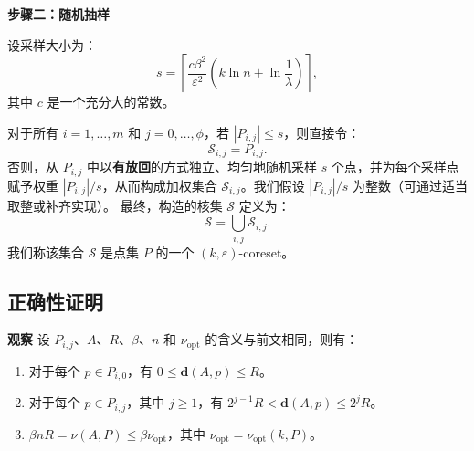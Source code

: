 \documentclass[lang=cn,newtx,10pt,scheme=chinese,chinesefont=nofont,citestyle=gb7714-2015, bibstyle=gb7714-2015]{elegantbook}
\begin{document}
\begin{refsection}




\noindent \textbf{步骤二：随机抽样}

设采样大小为：
\begin{equation}
s = \left\lceil \frac{c \beta^2}{\varepsilon^2} \left( k \ln n + \ln \frac{1}{\lambda} \right) \right\rceil,
\end{equation}
其中 $c$ 是一个充分大的常数。

对于所有 $i = 1, \dots, m$ 和 $j = 0, \dots, \phi$，若 $|P_{i,j}| \leq s$，则直接令：
\[
\mathcal{S}_{i,j} = P_{i,j}.
\]
否则，从 $P_{i,j}$ 中以\textbf{有放回}的方式独立、均匀地随机采样 $s$ 个点，并为每个采样点赋予权重 $|P_{i,j}| / s$，从而构成加权集合 $\mathcal{S}_{i,j}$。我们假设 $|P_{i,j}| / s$ 为整数（可通过适当取整或补齐实现）。
最终，构造的核集 $\mathcal{S}$ 定义为：
\[
\mathcal{S} = \bigcup_{i,j} \mathcal{S}_{i,j}.
\]
我们称该集合 $\mathcal{S}$ 是点集 $P$ 的一个 $(k, \varepsilon)$-coreset。

\subsection{正确性证明}
\noindent \textbf{观察}  \quad 设 $P_{i,j}$、$A$、$R$、$\beta$、$n$ 和 $\nu_{\mathrm{opt}}$ 的含义与前文相同，则有：
\begin{enumerate}
    \item 对于每个 $p \in P_{i,0}$，有 $0 \leq \mathbf{d}(A, p) \leq R$。
    \item 对于每个 $p \in P_{i,j}$，其中 $j \geq 1$，有 $2^{j-1}R < \mathbf{d}(A, p) \leq 2^j R$。
    \item $\beta n R = \nu(A, P) \leq \beta \nu_{\mathrm{opt}}$，其中 $\nu_{\mathrm{opt}} = \nu_{\mathrm{opt}}(k, P)$。
\end{enumerate}


\end{refsection}
\end{document}
